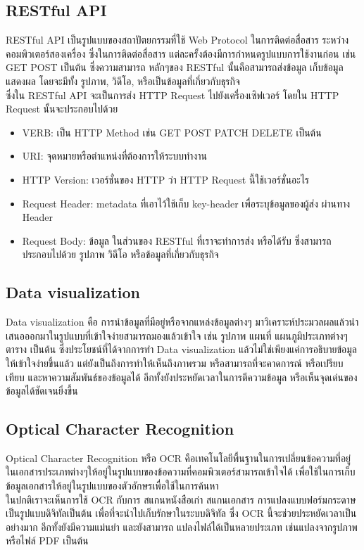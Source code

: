 \documentclass[12pt,oneside,openright,a4paper]{cpe-thai-project}
\begin{document}
\subsection{RESTful API}
\hspace*{1cm}RESTful API \cite{WhatIsRESTful} เป็นรูปแบบของสถาปัตยกรรมที่ใช้ Web Protocol ในการติดต่อสื่อสาร ระหว่างคอมพิวเตอร์สองเครื่อง ซึ่งในการติดต่อสื่อสาร แต่ละครั้งต้องมีการกำหนดรูปแบบการใช้งานก่อน เช่น GET POST เป็นต้น ซึ่งความสามารถ หลักๆของ RESTful นั้นคือสามารถส่งข้อมูล เก็บข้อมูล แสดงผล โดยจะมีทั้ง รูปภาพ, วิดีโอ, หรือเป็นข้อมูลที่เกี่ยวกับธุรกิจ\\
\hspace*{1cm}ซึ่งใน RESTful API จะเป็นการส่ง HTTP Request ไปยังเครื่องเซิฟเวอร์ โดยใน HTTP Request นั้นจะประกอบไปด้วย
\begin{itemize}
  \item {VERB: เป็น HTTP Method เช่น GET POST PATCH DELETE เป็นต้น}
  \item {URI: จุดหมายหรือตำแหน่งที่ต้องการให้ระบบทำงาน}
  \item {HTTP Version: เวอร์ชั่นของ HTTP ว่า HTTP Request นี้ใช้เวอร์ชั่นอะไร}
  \item {Request Header: metadata ที่เอาไว้ใช้เก็บ key-header เพื่อระบุข้อมูลของผู้ส่ง ผ่านทาง Header}
  \item {Request Body: ข้อมูล ในส่วนของ RESTful ที่เราจะทำการส่ง หรือได้รับ ซึ่งสามารถประกอบไปด้วย รูปภาพ วิดีโอ หรือข้อมูลที่เกี่ยวกับธุรกิจ}  
\end{itemize}

\subsection{Data visualization}
\hspace*{1cm} Data visualization \cite{WhatIsDataVisualization} คือ การนำข้อมูลที่มีอยู่หรือจากแหล่งข้อมูลต่างๆ มาวิเคราะห์ประมวลผลแล้วนำเสนอออกมาในรูปแบบที่เข้าใจง่ายสามารถมองแล้วเข้าใจ เช่น รูปภาพ แผนที่ แผนภูมิประเภทต่างๆ ตาราง เป็นต้น ซึ่งประโยชน์ที่ได้จากการทำ Data visualization แล้วไม่ใช่เพียงแค่การอธิบายข้อมูลให้เข้าใจง่ายขึ้นแล้ว แต่ยังเป็นถึงการทำให้เห็นถึงภาพรวม หรือสามารถที่จะคาดการณ์ หรือเปรียบเทียบ และหาความสัมพันธ์ของข้อมูลได้ อีกทั้งยังประหยัดเวลาในการตีความข้อมูล หรือเห็นจุดเด่นของข้อมูลได้ชัดเจนยิ่งขึ้น 

\subsection{Optical Character Recognition}
\hspace*{1cm} Optical Character Recognition หรือ OCR คือเทคโนโลยีพื้นฐานในการเปลี่ยนข้อความที่อยู่ในเอกสารประเภทต่างๆให้อยู่ในรูปแบบของข้อความที่คอมพิวเตอร์สามารถเข้าใจได้ เพื่อใช้ในการเก็บข้อมูลเอกสารให้อยู่ในรูปแบบของตัวอักษรเพื่อใช้ในการค้นหา \\
\hspace*{1cm} ในปกติเราจะเห็นการใช้ OCR กับการ สแกนหนังสือเก่า สแกนเอกสาร การแปลงแบบฟอร์มกระดาษเป็นรูปแบบดิจิทัลเป็นต้น เพื่อที่จะนำไปเก็บรักษาในระบบดิจิทัล ซึ่ง OCR นี้จะช่วยประหยัดเวลาเป็นอย่างมาก อีกทั้งยังมีความแม่นยำ และยังสามารถ แปลงไฟล์ได้เป็นหลายประเภท เช่นแปลงจากรูปภาพ หรือไฟล์ PDF เป็นต้น
\end{document}
